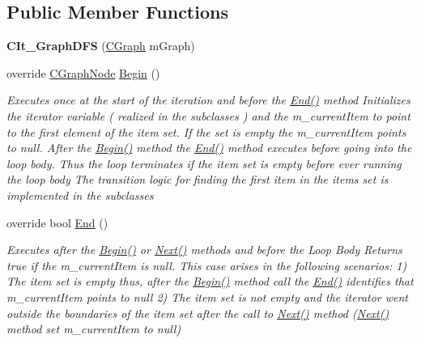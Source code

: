 \subsection*{Public Member Functions}
\begin{DoxyCompactItemize}
\item 
\hypertarget{class_graph_library_1_1_c_it___graph_d_f_s_afbed060eff3b2fbf3056e6bbb635c976}{}{\bfseries C\+It\+\_\+\+Graph\+D\+F\+S} (\hyperlink{class_graph_library_1_1_c_graph}{C\+Graph} m\+Graph)\label{class_graph_library_1_1_c_it___graph_d_f_s_afbed060eff3b2fbf3056e6bbb635c976}

\item 
override \hyperlink{class_graph_library_1_1_c_graph_node}{C\+Graph\+Node} \hyperlink{class_graph_library_1_1_c_it___graph_d_f_s_a0c5f16a80d9647af3bf1ad35507fe62a}{Begin} ()
\begin{DoxyCompactList}\small\item\em Executes once at the start of the iteration and before the \hyperlink{class_graph_library_1_1_c_it___graph_d_f_s_a6f6992493bc70c2e551c5d46bf9bf998}{End()} method Initializes the iterator variable ( realized in the subclasses ) and the m\+\_\+current\+Item to point to the first element of the item set. If the set is empty the m\+\_\+current\+Item points to null. After the \hyperlink{class_graph_library_1_1_c_it___graph_d_f_s_a0c5f16a80d9647af3bf1ad35507fe62a}{Begin()} method the \hyperlink{class_graph_library_1_1_c_it___graph_d_f_s_a6f6992493bc70c2e551c5d46bf9bf998}{End()} method executes before going into the loop body. Thus the loop terminates if the item set is empty before ever running the loop body The transition logic for finding the first item in the items set is implemented in the subclasses \end{DoxyCompactList}\item 
override bool \hyperlink{class_graph_library_1_1_c_it___graph_d_f_s_a6f6992493bc70c2e551c5d46bf9bf998}{End} ()
\begin{DoxyCompactList}\small\item\em Executes after the \hyperlink{class_graph_library_1_1_c_it___graph_d_f_s_a0c5f16a80d9647af3bf1ad35507fe62a}{Begin()} or \hyperlink{class_graph_library_1_1_c_it___graph_d_f_s_a89cf17a75298dabb07d6d0ce06895e78}{Next()} methods and before the Loop Body Returns true if the m\+\_\+current\+Item is null. This case arises in the following scenarios\+: 1) The item set is empty thus, after the \hyperlink{class_graph_library_1_1_c_it___graph_d_f_s_a0c5f16a80d9647af3bf1ad35507fe62a}{Begin()} method call the \hyperlink{class_graph_library_1_1_c_it___graph_d_f_s_a6f6992493bc70c2e551c5d46bf9bf998}{End()} identifies that m\+\_\+current\+Item points to null 2) The item set is not empty and the iterator went outside the boundaries of the item set after the call to \hyperlink{class_graph_library_1_1_c_it___graph_d_f_s_a89cf17a75298dabb07d6d0ce06895e78}{Next()} method (\hyperlink{class_graph_library_1_1_c_it___graph_d_f_s_a89cf17a75298dabb07d6d0ce06895e78}{Next()} method set m\+\_\+current\+Item to null) \end{DoxyCompactList}\item 

\end{DoxyCompactItemize}
